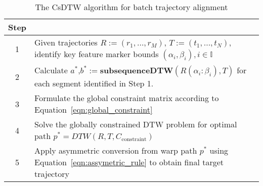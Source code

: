 \begin{table}[htbp]
  \centering
  \caption{The CsDTW algorithm for batch trajectory alignment}
  \begin{tabular}{cp{5in}}
    \toprule
    Step  & \\
    \midrule
    1 &  Given trajectories $R := (r_1,\ldots,r_M)$, $T := (t_1,\ldots,t_N)$, identify key feature marker bounds $(\alpha_i,\beta_i),i \in \mathbb{I}$\\
    2 &  Calculate $a^*$,$b^* := $\textbf{subsequenceDTW}$(R(\alpha_i:\beta_i),T)$ for each segment identified in Step 1.\\
    3 &  Formulate the global constraint matrix according to Equation~\ref{eqn:global_constraint}\\
    4 &  Solve the globally constrained DTW problem for optimal path $p^* = DTW(R,T,C_{\mathrm{constraint}})$\\
     5 & Apply asymmetric conversion from warp path $p^*$ using Equation~\ref{eqn:assymetric_rule} to obtain final target trajectory\\
    \bottomrule
  \end{tabular}%
  \label{tab:warping_algorithm}%
\end{table}
